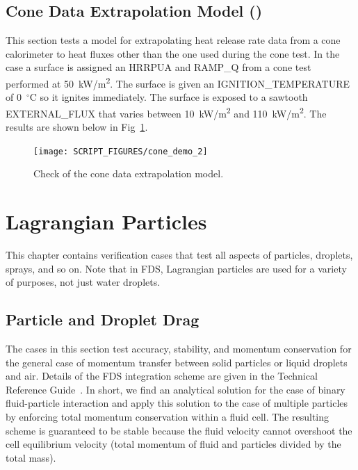 \documentclass[11pt]{book}
\begin{document}
\section{Cone Data Extrapolation Model (\texorpdfstring{}{cone\_demo\_2})}
\label{cone_demo_2}

This section tests a model for extrapolating heat release rate data from a cone calorimeter to heat fluxes other than the one used during the cone test. In the case a surface is assigned an {\ct HRRPUA} and {\ct RAMP\_Q} from a cone test performed at 50~\si{kW/m^2}. The surface is given an {\ct IGNITION\_TEMPERATURE} of 0~$^\circ$C so it ignites immediately. The surface is exposed to a sawtooth {\ct EXTERNAL\_FLUX} that varies between 10~\si{kW/m^2} and 110~\si{kW/m^2}. The results are shown below in Fig~\ref{fig:cone_demo_2}.

\begin{figure}[!ht]
	\centering
	\texttt{[image: SCRIPT\_FIGURES/cone\_demo\_2]}
	\caption[Cone data extrapolation model (the {\ct cone\_demo\_2} case)]{Check of the cone data extrapolation model.}
	\label{fig:cone_demo_2}
\end{figure}

\chapter{Lagrangian Particles}

This chapter contains verification cases that test all aspects of particles, droplets, sprays, and so on. Note that in FDS, Lagrangian particles are used for a variety of purposes, not just water droplets.

\section{Particle and Droplet Drag}

The cases in this section test accuracy, stability, and momentum conservation for the general case of momentum transfer between solid particles or liquid droplets and air. Details of the FDS integration scheme are given in the Technical Reference Guide~\cite{FDS_Tech_Guide}.  In short, we find an analytical solution for the case of binary fluid-particle interaction and apply this solution to the case of multiple particles by enforcing total momentum conservation within a fluid cell.  The resulting scheme is guaranteed to be stable because the fluid velocity cannot overshoot the cell equilibrium velocity (total momentum of fluid and particles divided by the total mass).
\end{document}
